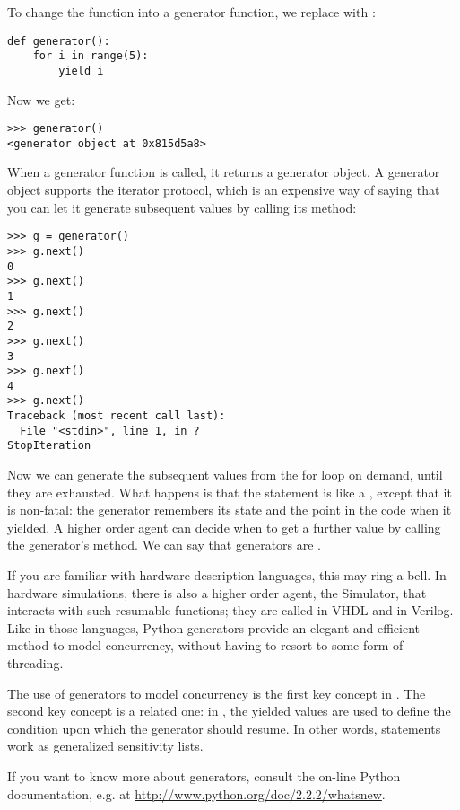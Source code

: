 To change the function into a generator function, we replace
 with :

\begin{verbatim}
def generator():
    for i in range(5):
        yield i
\end{verbatim}

Now we get:

\begin{verbatim}
>>> generator()
<generator object at 0x815d5a8>
\end{verbatim}

When a generator function is called, it returns a generator object. A
generator object supports the iterator protocol, which is an expensive
way of saying that you can let it generate subsequent values by
calling its  method:

\begin{verbatim}
>>> g = generator()
>>> g.next()
0
>>> g.next()
1
>>> g.next()
2
>>> g.next()
3
>>> g.next()
4
>>> g.next()
Traceback (most recent call last):
  File "<stdin>", line 1, in ?
StopIteration
\end{verbatim}

Now we can generate the subsequent values from the for loop on demand,
until they are exhausted. What happens is that the
 statement is like a
, except that it is non-fatal: the generator remembers
its state and the point in the code when it yielded. A higher order
agent can decide when to get a further value by calling the
generator's  method. We can say that generators are
.

If you are familiar with hardware description languages, this may ring
a bell. In hardware simulations, there is also a higher order agent,
the Simulator, that interacts with such resumable functions; they are
called  in VHDL and  in
Verilog. Like in those languages, Python generators provide an elegant
and efficient method to model concurrency, without having to resort to
some form of threading.

The use of generators to model concurrency is the first key concept in
\myhdl{}. The second key concept is a related one: in \myhdl{}, the
yielded values are used to define the condition upon which the
generator should resume. In other words, 
statements work as generalized sensitivity lists. 

If you want to know more about generators, consult the on-line Python
documentation, e.g. at \url{http://www.python.org/doc/2.2.2/whatsnew}. 

